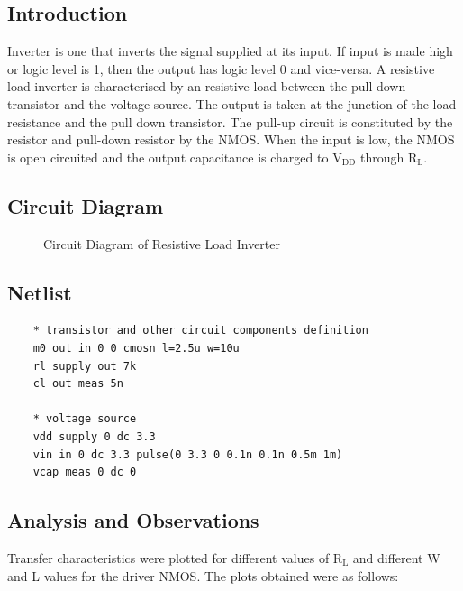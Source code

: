 \documentclass[12pt]{article}
\begin{document}
	\subsection{Introduction}
	Inverter is one that inverts the signal supplied at its input. If input is made high or logic level is 1, then the output has logic level 0 and vice-versa. A resistive load inverter is characterised by an resistive load between the pull down transistor and the voltage source. The output is taken at the junction of the load resistance and the pull down transistor. The pull-up circuit is constituted by the resistor and pull-down resistor by the NMOS. When the input is low, the NMOS is open circuited and the output capacitance is charged to $\text{V}_\text{DD}$ through $\text{R}_\text{L}$.
	
	\subsection{Circuit Diagram}
	\begin{figure}[H]
		\begin{center}
			
			\caption{Circuit Diagram of Resistive Load Inverter}
			\label{fig::resloadckt}
		\end{center}
	\end{figure}

	\subsection{Netlist}
    \begin{lstlisting}
    * transistor and other circuit components definition
    m0 out in 0 0 cmosn l=2.5u w=10u
    rl supply out 7k
    cl out meas 5n
    
    * voltage source
    vdd supply 0 dc 3.3
    vin in 0 dc 3.3 pulse(0 3.3 0 0.1n 0.1n 0.5m 1m)
    vcap meas 0 dc 0
    \end{lstlisting}
    
    \subsection{Analysis and Observations}
    
    Transfer characteristics were plotted for different values of $\text{R}_\text{L}$ and different W and L values for the driver NMOS. The plots obtained were as follows:
    
\end{document}
